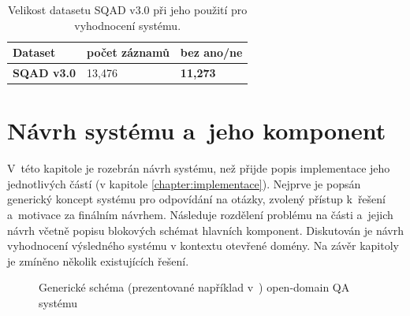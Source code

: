 \begin{table}[H]
\centering
\begin{tabular}{|l|l|l|}
\hline
Dataset            & počet záznamů & bez ano/ne      \\ \hline
\textbf{SQAD v3.0} & 13,476        & \textbf{11,273} \\ \hline
\end{tabular}
\caption{Velikost datasetu SQAD v3.0 při jeho použití pro vyhodnocení systému.}
\label{tab:sqad_size}
\end{table}


\chapter{Návrh systému a~jeho komponent}
\label{chapter:design_}
V~této kapitole je rozebrán návrh systému, než přijde popis implementace jeho jednotlivých částí (v kapitole \ref{chapter:implementace}). Nejprve je popsán generický koncept systému pro odpovídání na otázky, zvolený přístup k~řešení a~motivace za finálním návrhem. Následuje rozdělení problému na části a~jejich návrh včetně popisu blokových schémat hlavních komponent. Diskutován je návrh vyhodnocení výsledného systému v kontextu otevřené domény. Na závěr kapitoly je zmíněno několik existujících řešení.

\begin{figure}[hbt]
	\centering
	\caption{Generické schéma (prezentované například v~\cite{drQA}) open-domain QA systému}
	\label{qa_scheme}
\end{figure}

